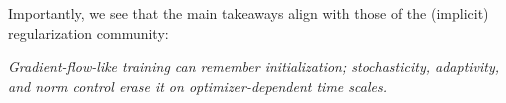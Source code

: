 \documentclass{article}
\newcommand{\sigw}{\sigma_w}
\newcommand{\claimbox}[1]{%
\begin{center}
\fbox{\begin{minipage}{0.88\linewidth}
\centering\itshape #1
\end{minipage}}
\end{center}
}
\begin{document}
Importantly, we see that the main takeaways align with those of the (implicit) regularization community:
\vspace{-0.3em}
\begin{center}
    \textit{Gradient-flow-like training can remember initialization; stochasticity, adaptivity, and norm control erase it on optimizer-dependent time scales.}
\end{center}
\vspace{-0.3em}






\end{document}
